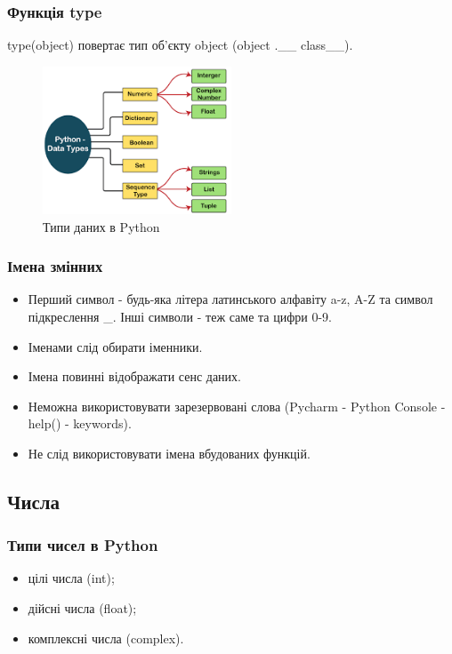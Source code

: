 \begin{frame}
\frametitle{Функція type}
type(object) повертає тип об'єкту object (object .\_\_ class\_\_).
\begin{figure}
\begin{center}
 \includegraphics[width=0.5\textwidth]{pictures/python_data_types.png}
\caption{Типи даних в Python}
\label{data_types} 
\end{center}
\end{figure}
\end{frame}


\begin{frame}
\frametitle{Імена змінних}
\begin{itemize}
  \item Перший символ - будь-яка літера латинського алфавіту a-z, A-Z та символ підкреслення \_. Інші символи - теж саме та цифри 0-9.
  \item Іменами слід обирати іменники.
  \item Імена повинні відображати сенс даних.
  \item Неможна використовувати зарезервовані слова (Pycharm - Python Console - help() - keywords).
  \item Не слід використовувати імена вбудованих функцій.
\end{itemize}
\end{frame}

\subsection{Числа}
 
\begin{frame}
\frametitle{Типи чисел в Python}
\begin{itemize}
  \item цілі числа (int);
  \item дійсні числа (float);
  \item комплексні числа (complex).
\end{itemize} 
  
\end{frame}

